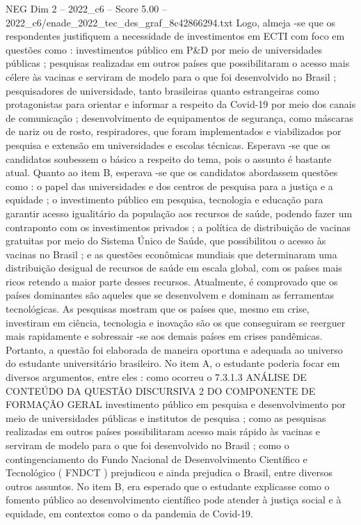 \begin{textsample}{NEG Dim 2 – 2022\_c6 – Score 5.00 – 2022\_c6/enade\_2022\_tec\_des\_graf\_8c42866294.txt}
Logo, almeja -se que os respondentes justifiquem a necessidade de investimentos em ECTI com foco em questões como : investimentos público em P\&D por meio de universidades públicas ; pesquisas realizadas em outros países que possibilitaram o acesso mais célere às vacinas e serviram de modelo para o que foi desenvolvido no Brasil ; pesquisadores de universidade, tanto brasileiras quanto estrangeiras como protagonistas para orientar e informar a respeito da Covid-19 por meio dos canais de comunicação ; desenvolvimento de equipamentos de segurança, como máscaras de nariz ou de rosto, respiradores, que foram implementados e viabilizados por pesquisa e extensão em universidades e escolas técnicas.
Esperava -se que os candidatos soubessem o básico a respeito do tema, pois o assunto é bastante atual.
Quanto ao item B, esperava -se que os candidatos abordassem questões como : o papel das universidades e dos centros de pesquisa para a justiça e a equidade ; o investimento público em pesquisa, tecnologia e educação para garantir acesso igualitário da população aos recursos de saúde, podendo fazer um contraponto com os investimentos privados ; a política de distribuição de vacinas gratuitas por meio do Sistema Único de Saúde, que possibilitou o acesso às vacinas no Brasil ; e as questões econômicas mundiais que determinaram uma distribuição desigual de recursos de saúde em escala global, com os países mais ricos retendo a maior parte desses recursos.
Atualmente, é comprovado que os países dominantes são aqueles que se desenvolvem e dominam as ferramentas tecnológicas.
As pesquisas mostram que os países que, mesmo em crise, investiram em ciência, tecnologia e inovação são os que conseguiram se reerguer mais rapidamente e sobressair -se aos demais países em crises pandêmicas.
Portanto, a questão foi elaborada de maneira oportuna e adequada ao universo do estudante universitário brasileiro.
No item A, o estudante poderia focar em diversos argumentos, entre eles : como ocorreu o 7.3.1.3 ANÁLISE DE CONTEÚDO DA QUESTÃO DISCURSIVA 2 DO COMPONENTE DE FORMAÇÃO GERAL investimento público em pesquisa e desenvolvimento por meio de universidades públicas e institutos de pesquisa ; como as pesquisas realizadas em outros países possibilitaram acesso mais rápido às vacinas e serviram de modelo para o que foi desenvolvido no Brasil ; como o contingenciamento do Fundo Nacional de Desenvolvimento Científico e Tecnológico ( FNDCT ) prejudicou e ainda prejudica o Brasil, entre diversos outros assuntos.
No item B, era esperado que o estudante explicasse como o fomento público ao desenvolvimento científico pode atender à justiça social e à equidade, em contextos como o da pandemia de Covid-19.

\end{textsample}
